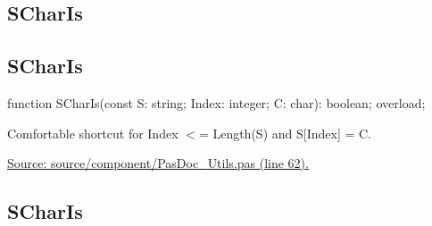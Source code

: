 \documentclass{report}
\newif\ifpdf
\begin{document}
\subsection*{\large{\textbf{SCharIs}}\normalsize\hspace{1ex}\hrulefill}
\else
\subsection*{SCharIs}
\fi
\label{PasDoc_Utils-SCharIs}
\begin{list}{}{
\setlength{\itemindent}{0cm}
\setlength{\listparindent}{0cm}
\setlength{\leftmargin}{\evensidemargin}
\addtolength{\leftmargin}{\tmplength}
\settowidth{\labelsep}{X}
\addtolength{\leftmargin}{\labelsep}
\setlength{\labelwidth}{\tmplength}
}
\item[\textbf{Declaration}\hfill]
\ifpdf
\begin{flushleft}
\fi
\begin{ttfamily}
function SCharIs(const S: string; Index: integer; C: char): boolean; overload;\end{ttfamily}

\ifpdf
\end{flushleft}
\fi

\par
\item[\textbf{Description}]
Comfortable shortcut for Index {$<$}= Length(S) and S[Index] = C.\par
\href{https://github.com/pasdoc/pasdoc/blob/master/source/component/PasDoc_Utils.pas#L62}{Source: source/component/PasDoc{\_}Utils.pas (line 62).}

\end{list}
\ifpdf
\subsection*{\large{\textbf{SCharIs}}\normalsize\hspace{1ex}\hrulefill}
\else
\end{document}
